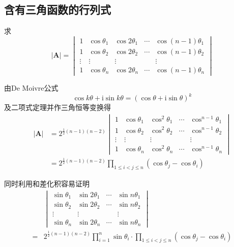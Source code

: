 \subsection{含有三角函数的行列式}
\begin{brown}
    \begin{problem}
求
\[
\left|\bm{A}\right|
=
\begin{vmatrix}
    1&\cos \theta_1&\cos2\theta_1&\cdots&\cos\left(n-1\right)\theta_1
\\
    1&\cos \theta_2&\cos2\theta_2&\cdots&\cos\left(n-1\right)\theta_2
\\
\vdots&\vdots&\vdots&&\vdots\\
    1&\cos \theta_n&\cos2\theta_n&\cdots&\cos\left(n-1\right)\theta_n
\end{vmatrix}
\]
\end{problem}
\begin{solution}
由\textup{De Moivre}公式
\[
\cos k\theta +\mathrm{i}\sin k\theta = 
\left(\cos \theta + \mathrm{i}\sin \theta\right)^k
\]及二项式定理并作三角恒等变换得
\begin{align*}
    \left|\bm{A}\right|
&=
2^{\frac{1}{2}\left(n-1\right)\left(n-2\right)}
\begin{vmatrix}
    1&\cos \theta_1&\cos^2\theta_1&\cdots&\cos^{n-1}\theta_1
\\
    1&\cos \theta_2&\cos^2\theta_2&\cdots&\cos^{n-1}\theta_2
\\
\vdots&\vdots&\vdots&&\vdots\\
    1&\cos \theta_n&\cos^2\theta_n&\cdots&\cos^{n-1}\theta_n
\end{vmatrix}\\
&=2^{\frac{1}{2}\left(n-1\right)\left(n-2\right)}
\prod_{1\leqslant i<j
\leqslant n}\left(\cos \theta_j-\cos \theta_i\right)
\end{align*}
\end{solution}
同时利用和差化积容易证明
\begin{align*}
    &\begin{vmatrix}
        \sin \theta_1 & \sin 2\theta_1 & \cdots&\sin n\theta_1\\
        \sin \theta_2&\sin 2\theta_2&\cdots&    \sin n\theta_2\\
        \vdots&\vdots&&\vdots\\
        \sin \theta_n&\sin 2\theta_n&\cdots&\sin n\theta_n
    \end{vmatrix}\\
    =&
    2^{\frac{1}{2}
    \left(n-1\right)
    \left(n-2\right)}
    \prod_{i=1}^{n}\sin \theta_i \cdot
    \prod_{1\leqslant i<j
\leqslant n}\left(\cos \theta_j-\cos \theta_i\right)
\end{align*}
\end{brown}
